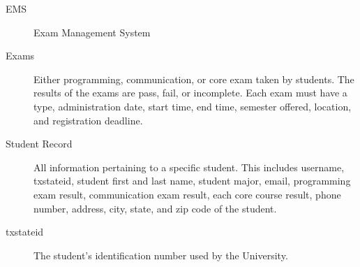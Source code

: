 
\begin{description}
   \item[EMS] Exam Management System 
   \item[Exams]  Either programming, communication, or core exam taken by students.
      The results of the exams are pass, fail, or incomplete. Each exam must
      have a type, administration date, start time, end time, semester offered,
      location, and registration deadline.
   \item[Student Record]  All information pertaining to a specific student. This
      includes username, txstateid, student first and last name, student major,
      email, programming exam result, communication exam result, each core
      course result, phone number, address, city, state, and zip code of the
      student.
   \item[txstateid] The student's identification number used by the University.
\end{description}
